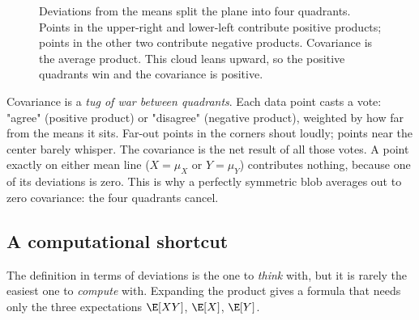 \begin{figure}[H]
\centering
{}
\caption{Deviations from the means split the plane into four quadrants. Points in
the upper-right and lower-left contribute positive products; points in the other
two contribute negative products. Covariance is the average product. This cloud
leans upward, so the positive quadrants win and the covariance is positive.}
\label{ch14:fig-quadrants}
\end{figure}

\begin{happeningbox}
Covariance is a \emph{tug of war between quadrants}. Each data point casts a vote:
"agree" (positive product) or "disagree" (negative product), weighted by how far
from the means it sits. Far-out points in the corners shout loudly; points near the
center barely whisper. The covariance is the net result of all those votes. A point
exactly on either mean line ($X = \mu_X$ or $Y = \mu_Y$) contributes nothing,
because one of its deviations is zero. This is why a perfectly symmetric blob
averages out to zero covariance: the four quadrants cancel.
\end{happeningbox}

\subsection{A computational shortcut}

The definition in terms of deviations is the one to \emph{think} with, but it is
rarely the easiest one to \emph{compute} with. Expanding the product gives a formula
that needs only the three expectations $\E[XY]$, $\E[X]$, $\E[Y]$.

